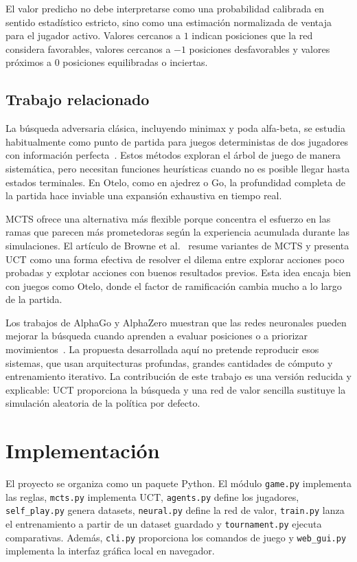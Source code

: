 \documentclass[conference,a4paper]{IEEEtran}
\begin{document}
El valor predicho no debe interpretarse como una probabilidad calibrada en
sentido estadístico estricto, sino como una estimación normalizada de ventaja
para el jugador activo. Valores cercanos a \(1\) indican posiciones que la red
considera favorables, valores cercanos a \(-1\) posiciones desfavorables y
valores próximos a \(0\) posiciones equilibradas o inciertas.

\subsection{Trabajo relacionado}

La búsqueda adversaria clásica, incluyendo minimax y poda alfa-beta, se estudia
habitualmente como punto de partida para juegos deterministas de dos jugadores
con información perfecta~\cite{russell2020}. Estos métodos exploran el árbol de
juego de manera sistemática, pero necesitan funciones heurísticas cuando no es
posible llegar hasta estados terminales. En Otelo, como en ajedrez o Go, la
profundidad completa de la partida hace inviable una expansión exhaustiva en
tiempo real.

MCTS ofrece una alternativa más flexible porque concentra el esfuerzo en las
ramas que parecen más prometedoras según la experiencia acumulada durante las
simulaciones. El artículo de Browne et al.~\cite{browne2012} resume variantes
de MCTS y presenta UCT como una forma efectiva de resolver el dilema entre
explorar acciones poco probadas y explotar acciones con buenos resultados
previos. Esta idea encaja bien con juegos como Otelo, donde el factor de
ramificación cambia mucho a lo largo de la partida.

Los trabajos de AlphaGo y AlphaZero muestran que las redes neuronales pueden
mejorar la búsqueda cuando aprenden a evaluar posiciones o a priorizar
movimientos~\cite{silver2016, silver2017}. La propuesta desarrollada aquí no
pretende reproducir esos sistemas, que usan arquitecturas profundas, grandes
cantidades de cómputo y entrenamiento iterativo. La contribución de este trabajo
es una versión reducida y explicable: UCT proporciona la búsqueda y una red de
valor sencilla sustituye la simulación aleatoria de la política por defecto.

\section{Implementación}

El proyecto se organiza como un paquete Python. El módulo \texttt{game.py}
implementa las reglas, \texttt{mcts.py} implementa UCT, \texttt{agents.py}
define los jugadores, \texttt{self\_play.py} genera datasets,
\texttt{neural.py} define la red de valor, \texttt{train.py} lanza el
entrenamiento a partir de un dataset guardado y \texttt{tournament.py} ejecuta
comparativas. Además, \texttt{cli.py} proporciona los comandos de juego y
\texttt{web\_gui.py} implementa la interfaz gráfica local en navegador.
\end{document}

